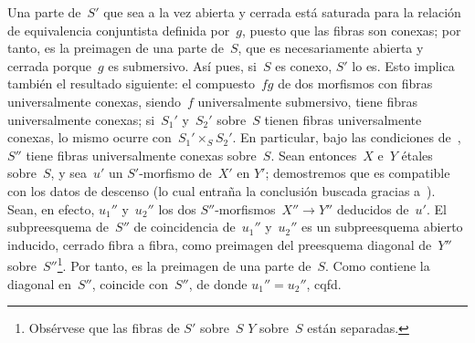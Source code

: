 Una parte de~$S'$ que sea a la vez abierta y cerrada está saturada para la
relación de equivalencia conjuntista definida por~$g$, puesto que las
fibras son conexas; por tanto, es la preimagen de una parte de~$S$, que es
necesariamente abierta y cerrada porque~$g$ es submersivo. Así pues, si~$S$
es conexo, $S'$ lo es. Esto implica también el resultado siguiente: el
compuesto~$fg$ de dos morfismos con fibras universalmente conexas,
%
siendo~$f$ universalmente submersivo, tiene fibras universalmente conexas;
si~$S_1'$ y~$S_2'$ sobre~$S$ tienen fibras universalmente conexas, lo mismo
ocurre con~$S_1'\times_S S_2'$. En particular, bajo las condiciones
de~, $S''$ tiene fibras universalmente conexas sobre~$S$. Sean
entonces~$X$ e~$Y$ étales sobre~$S$, y sea~$u'$ un $S'$-morfismo de~$X'$ en
$Y'$; demostremos que es compatible con los datos de descenso (lo cual
entraña la conclusión buscada gracias a~). Sean, en efecto,
$u_1''$ y~$u_2''$ los dos $S''$-morfismos~$X''\to Y''$ deducidos de~$u'$.
El subpreesquema de~$S''$ de coincidencia de~$u_1''$ y~$u_2''$ es un
subpreesquema abierto inducido, cerrado fibra a fibra, como preimagen del
preesquema diagonal de~$Y''$ sobre~$S''$\kern1pt\footnote{Obsérvese que las
fibras de
{$S'$ sobre~$S$}
{$Y$ sobre~$S$}
están separadas.}. Por tanto, es la preimagen de una parte de~$S$. Como
contiene la diagonal en~$S''$, coincide con~$S''$, de donde
$u_1''=u_2''$, cqfd.
